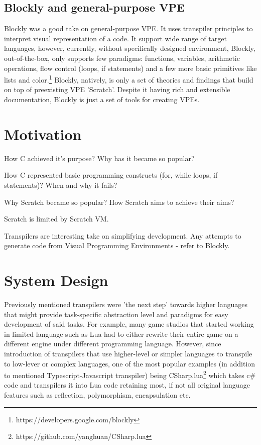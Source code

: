 \documentclass{article}
\begin{document}
\subsection{Blockly and general-purpose VPE}
Blockly was a good take on general-purpose VPE. It uses transpiler principles to interpret visual representation of a code. It support wide range of target languages, however, currently, without specifically designed environment, Blockly, out-of-the-box, only supports few paradigms: functions, variables, arithmetic operations, flow control (loops, if statements) and a few more basic primitives like lists and color.\footnote{https://developers.google.com/blockly}
Blockly, natively, is only a set of theories and findings that build on top of preexisting VPE 'Scratch'. Despite it having rich and extensible documentation, Blockly is just a set of tools for creating VPEs.





\section{Motivation}
\label{sec:motive}
How C achieved it's purpose?
Why has it became so popular?

How C represented basic programming constructs (for, while loops, if statements)?
When and why it fails?

Why Scratch became so popular?
How Scratch aims to achieve their aims?

Scratch is limited by Scratch VM.

Transpilers are interesting take on simplifying development.
Any attempts to generate code from Visual Programming Environments - refer to Blockly.






\section{System Design}
Previously mentioned transpilers were 'the next step' towards higher languages that might provide task-specific abstraction level and paradigms for easy development of said tasks. For example, many game studios that started working in limited language such as Lua had to either rewrite their entire game on a different engine under different programming language. However, since introduction of transpilers that use higher-level or simpler languages to transpile to low-lever or complex languages, one of the most popular examples (in addition to mentioned Typescript-Javascript transpiler) being CSharp.lua\footnote{https://github.com/yanghuan/CSharp.lua} which takes c\# code and transpilers it into Lua code retaining most, if not all original language features such as reflection, polymorphism, encapsulation etc.
\end{document}
